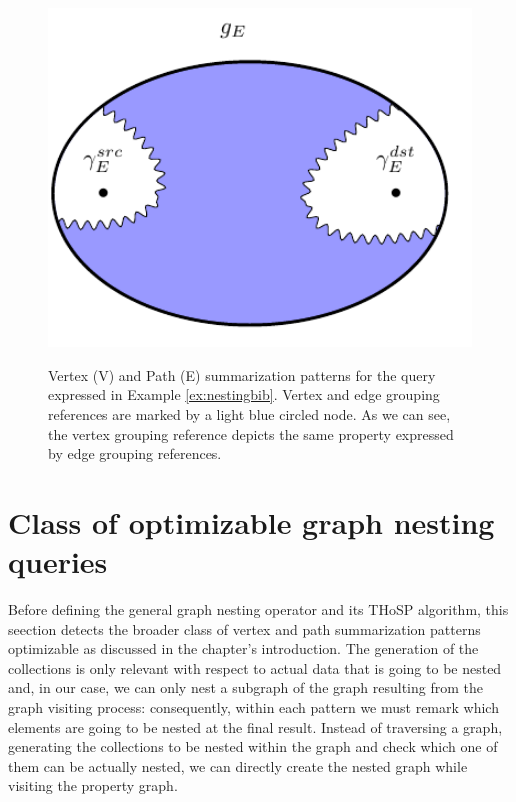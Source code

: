 \begin{figure}[!tp]
\begin{minipage}[!t]{0.45\textwidth}
		\label{fig:edgewithIntersectionNonSRC}
	\end{minipage}\quad \begin{minipage}[!t]{0.45\textwidth}
		\centering
		\includegraphics[width=1\textwidth]{fig/06nesting/03_edge_analysis.pdf}
		\label{fig:edgeWithNoIntersection}
	\end{minipage}
	\caption{Vertex (V) and Path (E) summarization patterns for the query expressed in Example \vref{ex:nestingbib}. Vertex and edge grouping references are marked by a light blue circled node. As we can see, the vertex grouping reference depicts the same property expressed by edge grouping references.}
	\label{fig:patternAnalysis}
\end{figure}
\section{Class of optimizable graph nesting queries}\label{sec:optimizableClass}
Before defining the general graph nesting operator and its THoSP algorithm, this seection detects the broader class of vertex and path summarization patterns optimizable as discussed in the chapter's introduction. The generation of the collections is only relevant with respect to actual data that is going to be nested and, in our case, we can only nest a subgraph of the graph resulting from the graph visiting process: consequently, within each pattern we must remark which elements are going to be nested at the final result. Instead of traversing a graph, generating the collections to be nested within the graph and check which one of them can be actually nested, we can directly create the nested graph while visiting the property graph.

